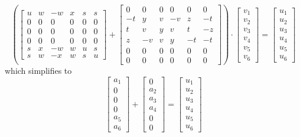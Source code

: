 \documentclass[a4paper,10pt]{article}
\theoremstyle{plain}
\theoremstyle{definition}
\theoremstyle{remark}
\begin{document}
\begin{equation}
	\left( 
	\begin{bmatrix}
		u  & w  & -w & x  & s  & s  \\
		0 & 0 & 0 & 0 & 0 & 0 \\
		0 & 0 & 0 & 0 & 0 & 0 \\
		0 & 0 & 0 & 0 & 0 & 0 \\
		s  & x  & -w & w  & u  & s  \\
		s  & w  & -x & w  & s  & u
	\end{bmatrix} 
	+ 
	\begin{bmatrix}
		0 & 0 & 0 & 0 & 0 & 0 \\
		-t & y  & v  & -v & z  & -t \\
		t  & v  & y  & v  & t  & -z \\
		z  & -v & v  & y  & -t & -t \\
		0 & 0 & 0 & 0 & 0 & 0 \\
		0 & 0 & 0 & 0 & 0 & 0
	\end{bmatrix}
	\right) 
	\cdot
	\begin{bmatrix}
		v_1 \\
		v_2 \\
		v_3 \\
		v_4 \\
		v_5 \\
		v_6
	\end{bmatrix}
	=
	\begin{bmatrix}
		u_1 \\
		u_2 \\
		u_3 \\
		u_4 \\
		u_5 \\
		u_6
	\end{bmatrix}
\end{equation}
which simplifies to
\begin{equation}
	\begin{bmatrix}
		a_1 \\
		0 \\
		0 \\
		0 \\
		a_5 \\
		a_6
	\end{bmatrix}
	+
	\begin{bmatrix}
		0 \\
		a_2 \\
		a_3 \\
		a_4 \\
		0 \\
		0
	\end{bmatrix}
	=
	\begin{bmatrix}
		u_1 \\
		u_2 \\
		u_3 \\
		u_4 \\
		u_5 \\
		u_6
	\end{bmatrix}
\end{equation}
\end{document}
